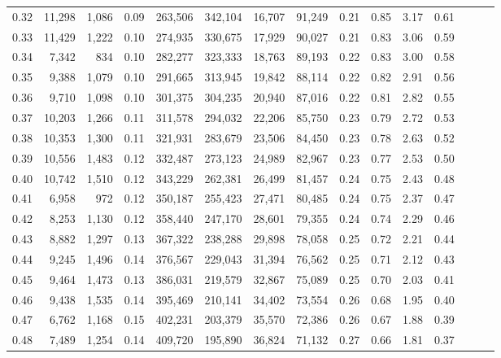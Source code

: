 \begin{tabular}{rrrrrrrrrrrrrrr}
0.32 &  11,298 &  1,086 &  0.09 &  263,506 &  342,104 &   16,707 &   91,249 &  0.21 &  0.85 &  3.17 &      0.61 \\
0.33 &  11,429 &  1,222 &  0.10 &  274,935 &  330,675 &   17,929 &   90,027 &  0.21 &  0.83 &  3.06 &      0.59 \\
0.34 &   7,342 &    834 &  0.10 &  282,277 &  323,333 &   18,763 &   89,193 &  0.22 &  0.83 &  3.00 &      0.58 \\
0.35 &   9,388 &  1,079 &  0.10 &  291,665 &  313,945 &   19,842 &   88,114 &  0.22 &  0.82 &  2.91 &      0.56 \\
0.36 &   9,710 &  1,098 &  0.10 &  301,375 &  304,235 &   20,940 &   87,016 &  0.22 &  0.81 &  2.82 &      0.55 \\
0.37 &  10,203 &  1,266 &  0.11 &  311,578 &  294,032 &   22,206 &   85,750 &  0.23 &  0.79 &  2.72 &      0.53 \\
0.38 &  10,353 &  1,300 &  0.11 &  321,931 &  283,679 &   23,506 &   84,450 &  0.23 &  0.78 &  2.63 &      0.52 \\
0.39 &  10,556 &  1,483 &  0.12 &  332,487 &  273,123 &   24,989 &   82,967 &  0.23 &  0.77 &  2.53 &      0.50 \\
0.40 &  10,742 &  1,510 &  0.12 &  343,229 &  262,381 &   26,499 &   81,457 &  0.24 &  0.75 &  2.43 &      0.48 \\
0.41 &   6,958 &    972 &  0.12 &  350,187 &  255,423 &   27,471 &   80,485 &  0.24 &  0.75 &  2.37 &      0.47 \\
0.42 &   8,253 &  1,130 &  0.12 &  358,440 &  247,170 &   28,601 &   79,355 &  0.24 &  0.74 &  2.29 &      0.46 \\
0.43 &   8,882 &  1,297 &  0.13 &  367,322 &  238,288 &   29,898 &   78,058 &  0.25 &  0.72 &  2.21 &      0.44 \\
0.44 &   9,245 &  1,496 &  0.14 &  376,567 &  229,043 &   31,394 &   76,562 &  0.25 &  0.71 &  2.12 &      0.43 \\
0.45 &   9,464 &  1,473 &  0.13 &  386,031 &  219,579 &   32,867 &   75,089 &  0.25 &  0.70 &  2.03 &      0.41 \\
0.46 &   9,438 &  1,535 &  0.14 &  395,469 &  210,141 &   34,402 &   73,554 &  0.26 &  0.68 &  1.95 &      0.40 \\
0.47 &   6,762 &  1,168 &  0.15 &  402,231 &  203,379 &   35,570 &   72,386 &  0.26 &  0.67 &  1.88 &      0.39 \\
0.48 &   7,489 &  1,254 &  0.14 &  409,720 &  195,890 &   36,824 &   71,132 &  0.27 &  0.66 &  1.81 &      0.37 \\

\end{tabular}

